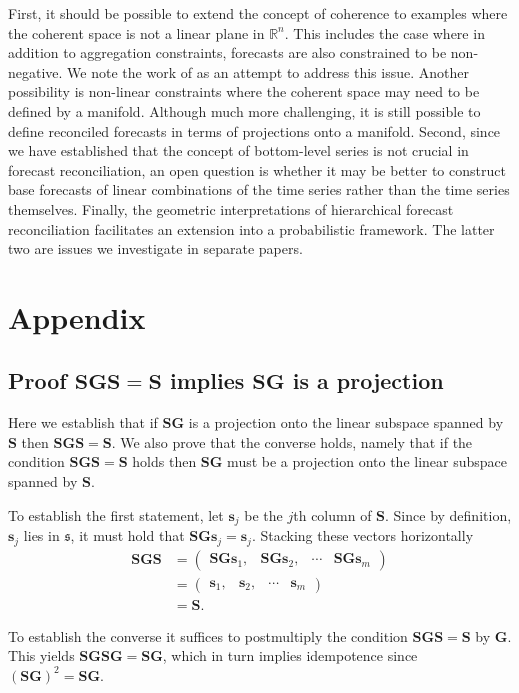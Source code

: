 \documentclass[12pt]{article}
\theoremstyle{definition}
\begin{document}
First, it should be possible to extend the concept of coherence {\color{blue}to examples where the coherent space is not a linear plane in $\mathbb{R}^n$.  This includes the case where in addition to aggregation constraints, forecasts are also constrained to be non-negative. We note the work of \cite{wickramasuriya2019optimal} as an attempt to address this issue.  Another possibility is} non-linear constraints where the coherent space may need to be defined by a manifold. Although much more challenging, it is still possible to define reconciled forecasts in terms of projections onto a manifold. Second, since we have established that the concept of bottom-level series is not crucial in forecast reconciliation, an open question is whether it may be better to construct base forecasts of linear combinations of the time series rather than the time series themselves. Finally, the geometric interpretations of hierarchical forecast reconciliation facilitates an extension into a probabilistic framework. The latter two are issues we investigate in separate papers.

\clearpage
\appendix

\section{Appendix}

\subsection{Proof $\bm{S}\bm{G}\bm{S}=\bm{S}$ implies $\bm{S}\bm{G}$ is a projection}\label{app:projection-proof}

Here we establish that if $\bm{S}\bm{G}$ is a projection onto the linear subspace spanned by $\bm{S}$ then $\bm{S}\bm{G}\bm{S}=\bm{S}$. We also prove that the converse holds, namely that if the condition $\bm{S}\bm{G}\bm{S}=\bm{S}$ holds then $\bm{S}\bm{G}$ must be a projection onto the linear subspace spanned by $\bm{S}$.

To establish the first statement, let $\bm{s}_j$ be the $j$th column of $\bm{S}$. Since by definition, $\bm{s}_j$ lies in $\mathfrak{s}$, it must hold that $\bm{S}\bm{G}\bm{s}_j=\bm{s}_j$. Stacking these vectors horizontally
\begin{align*}
\bm{S}\bm{G}\bm{S}
  & = \begin{pmatrix}
        \bm{S}\bm{G}\bm{s}_1, & \bm{S}\bm{G}\bm{s}_2, & \cdots & \bm{S}\bm{G}\bm{s}_m
      \end{pmatrix} \\
  & = \begin{pmatrix}
        \bm{s}_1, & \bm{s}_2, & \cdots & \bm{s}_m
      \end{pmatrix}\\
  & = \bm{S}.
\end{align*}

To establish the converse it suffices to postmultiply the condition $\bm{S}\bm{G}\bm{S}=\bm{S}$ by $\bm{G}$. This yields $\bm{S}\bm{G}\bm{S}\bm{G}=\bm{S}\bm{G}$, which in turn implies idempotence since $(\bm{S}\bm{G})^2=\bm{S}\bm{G}$.


\newpage




\end{document}
